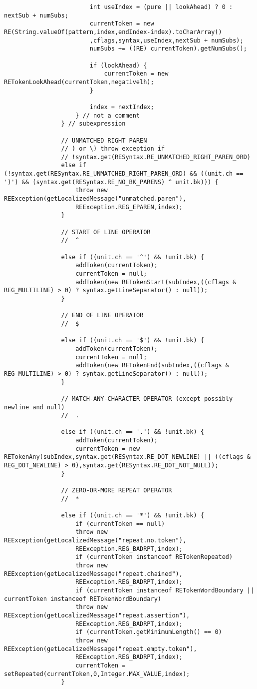 \begin{mdframed}
\begin{lstlisting}
						int useIndex = (pure || lookAhead) ? 0 : nextSub + numSubs;
						currentToken = new RE(String.valueOf(pattern,index,endIndex-index).toCharArray()
						,cflags,syntax,useIndex,nextSub + numSubs);
						numSubs += ((RE) currentToken).getNumSubs();
						
						if (lookAhead) {
							currentToken = new RETokenLookAhead(currentToken,negativelh);
						}
						
						index = nextIndex;
					} // not a comment
				} // subexpression
				
				// UNMATCHED RIGHT PAREN
				// ) or \) throw exception if
				// !syntax.get(RESyntax.RE_UNMATCHED_RIGHT_PAREN_ORD)
				else if (!syntax.get(RESyntax.RE_UNMATCHED_RIGHT_PAREN_ORD) && ((unit.ch == ')') && (syntax.get(RESyntax.RE_NO_BK_PARENS) ^ unit.bk))) {
					throw new REException(getLocalizedMessage("unmatched.paren"),
					REException.REG_EPAREN,index);
				}
				
				// START OF LINE OPERATOR
				//  ^
				
				else if ((unit.ch == '^') && !unit.bk) {
					addToken(currentToken);
					currentToken = null;
					addToken(new RETokenStart(subIndex,((cflags & REG_MULTILINE) > 0) ? syntax.getLineSeparator() : null));
				}
				
				// END OF LINE OPERATOR
				//  $
				
				else if ((unit.ch == '$') && !unit.bk) {
					addToken(currentToken);
					currentToken = null;
					addToken(new RETokenEnd(subIndex,((cflags & REG_MULTILINE) > 0) ? syntax.getLineSeparator() : null));
				}
				
				// MATCH-ANY-CHARACTER OPERATOR (except possibly newline and null)
				//  .
				
				else if ((unit.ch == '.') && !unit.bk) {
					addToken(currentToken);
					currentToken = new RETokenAny(subIndex,syntax.get(RESyntax.RE_DOT_NEWLINE) || ((cflags & REG_DOT_NEWLINE) > 0),syntax.get(RESyntax.RE_DOT_NOT_NULL));
				}
				
				// ZERO-OR-MORE REPEAT OPERATOR
				//  *
				
				else if ((unit.ch == '*') && !unit.bk) {
					if (currentToken == null)
					throw new REException(getLocalizedMessage("repeat.no.token"),
					REException.REG_BADRPT,index);
					if (currentToken instanceof RETokenRepeated)
					throw new REException(getLocalizedMessage("repeat.chained"),
					REException.REG_BADRPT,index);
					if (currentToken instanceof RETokenWordBoundary || currentToken instanceof RETokenWordBoundary)
					throw new REException(getLocalizedMessage("repeat.assertion"),
					REException.REG_BADRPT,index);
					if (currentToken.getMinimumLength() == 0)
					throw new REException(getLocalizedMessage("repeat.empty.token"),
					REException.REG_BADRPT,index);
					currentToken = setRepeated(currentToken,0,Integer.MAX_VALUE,index);
				}
				

\end{lstlisting}
\end{mdframed}
